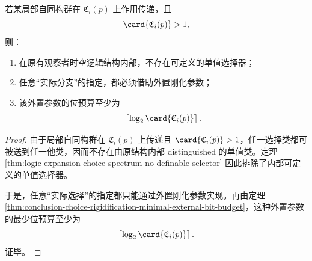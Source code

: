 \begin{corollary}\label{cor:conclusion-transitive-choice-symmetry-pure-externalization}
若某局部自同构群在 \(\mathfrak C_i(p)\) 上作用传递，且
\[
\card{\mathfrak C_i(p)}>1,
\]
则：
\begin{enumerate}
  \item 在原有观察者时空逻辑结构内部，不存在可定义的单值选择器；
  \item 任意“实际分支”的指定，都必须借助外置刚化参数；
  \item 该外置参数的位预算至少为
  \[
  \left\lceil\log_2 \card{\mathfrak C_i(p)}\right\rceil.
  \]
\end{enumerate}
\end{corollary}
\begin{proof}
由于局部自同构群在 \(\mathfrak C_i(p)\) 上传递且 \(\card{\mathfrak C_i(p)}>1\)，任一选择类都可被送到任一他类，因而不存在由原结构内部 distinguished 的单值类。定理 \ref{thm:logic-expansion-choice-spectrum-no-definable-selector} 因此排除了内部可定义的单值选择器。

于是，任意“实际选择”的指定都只能通过外置刚化参数实现。再由定理 \ref{thm:conclusion-choice-rigidification-minimal-external-bit-budget}，这种外置参数的最少位预算至少为
\[
\left\lceil\log_2 \card{\mathfrak C_i(p)}\right\rceil.
\]
证毕。
\end{proof}

